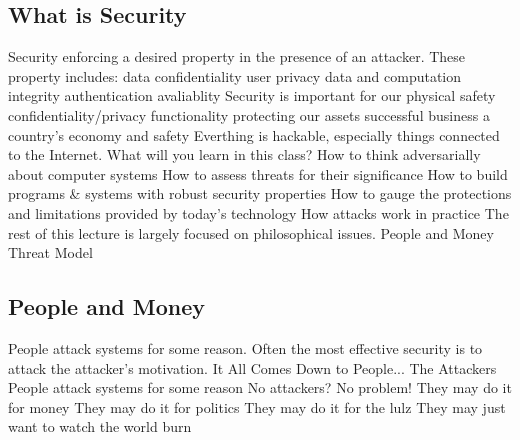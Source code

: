 \documentclass[11 pt]{scrartcl}
\begin{document}
\subsection{What is Security}
Security enforcing a desired property in the presence of an attacker. These property includes:
\itemnum
    \ii data confidentiality
    \ii user privacy
    \ii data and computation integrity
    \ii authentication
    \ii avaliablity
\itemend
Security is important for our
\itemnum
    \ii physical safety
    \ii confidentiality/privacy
    \ii functionality
    \ii protecting our assets
    \ii successful business
    \ii a country’s economy and safety
\itemend
Everthing is hackable, especially things connected to the Internet.\newline
What will you learn in this class?
\itemnum
    \ii How to think adversarially about computer systems
    \ii How to assess threats for their significance
    \ii How to build programs \& systems with robust security properties
    \ii How to gauge the protections and limitations provided by today's technology
    \ii How attacks work in practice
\itemend
The rest of this lecture is largely focused on philosophical issues.
\itemnum
    \ii People and Money
    \ii Threat Model
\itemend
\subsection{People and Money}
People attack systems for some reason. Often the most effective security is to attack the attacker's motivation.\newline
It All Comes Down to People... \newline
The Attackers\newline
People attack systems for some reason\newline
No attackers? No problem!
\itemnum
    \ii They may do it for money
    \ii They may do it for politics
    \ii They may do it for the lulz
    \ii They may just want to watch the world burn
\itemend
\end{document}
